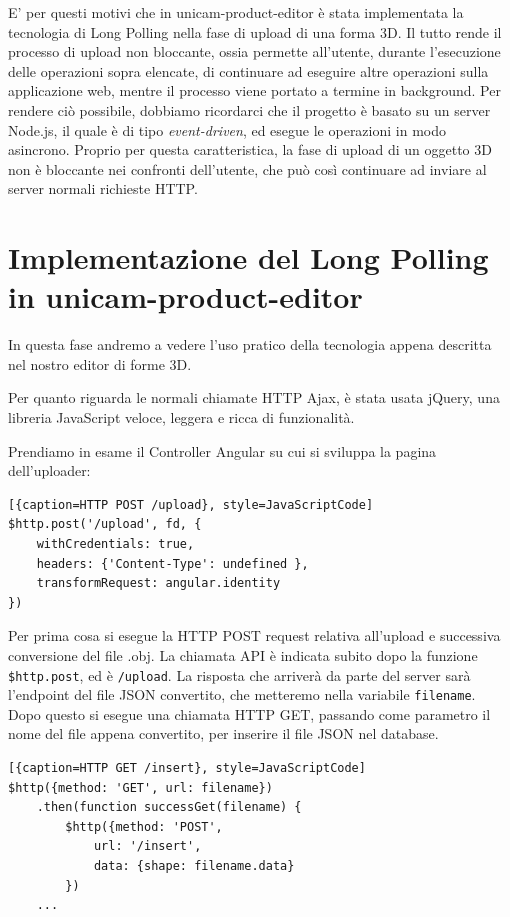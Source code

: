 E' per questi motivi che in unicam-product-editor è stata implementata 
la tecnologia di Long Polling nella fase di upload di una forma 3D.
Il tutto rende il processo di upload non bloccante, ossia permette 
all'utente, durante l'esecuzione delle operazioni sopra elencate, di 
continuare ad eseguire altre operazioni sulla applicazione web, mentre 
il processo viene portato a termine in background.
Per rendere ciò possibile, dobbiamo ricordarci che il progetto è basato 
su un server Node.js, il quale è di tipo \emph{event-driven}, ed esegue 
le operazioni in modo asincrono. Proprio per questa caratteristica, 
la fase di upload di un oggetto 3D non è bloccante nei confronti 
dell'utente, che può così continuare ad inviare al server normali 
richieste HTTP.

\section{Implementazione del Long Polling in unicam-product-editor}
In questa fase andremo a vedere l'uso pratico della tecnologia appena 
descritta nel nostro editor di forme 3D.

Per quanto riguarda le normali chiamate HTTP Ajax, è stata usata 
jQuery\cite{jquery}, una libreria JavaScript veloce, leggera e 
ricca di funzionalità.

Prendiamo in esame il Controller Angular su cui si sviluppa la 
pagina dell'uploader:

\begin{lstlisting}[{caption=HTTP POST /upload}, style=JavaScriptCode]
$http.post('/upload', fd, {
	withCredentials: true,
	headers: {'Content-Type': undefined },
	transformRequest: angular.identity
})
\end{lstlisting}
Per prima cosa si esegue la HTTP POST request relativa all'upload e 
successiva conversione del file .obj. La chiamata API è indicata 
subito dopo la funzione \texttt{\$http.post}, ed è \texttt{/upload}.
La risposta che arriverà da parte del server sarà l'endpoint del 
file JSON convertito, che metteremo nella variabile \texttt{filename}.
Dopo questo si esegue una chiamata HTTP GET, passando come parametro 
il nome del file appena convertito, per inserire il file JSON nel database.  

\begin{lstlisting}[{caption=HTTP GET /insert}, style=JavaScriptCode]
$http({method: 'GET', url: filename})
	.then(function successGet(filename) {
		$http({method: 'POST',
			url: '/insert',
			data: {shape: filename.data}
		})
	...
\end{lstlisting}

